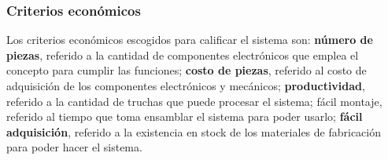 \subsubsection{Criterios económicos}

Los criterios económicos escogidos para calificar el sistema son: \textbf{número de piezas}, referido a la cantidad de componentes electrónicos que emplea el concepto para cumplir las funciones; \textbf{costo de piezas}, referido al costo de adquisición de los componentes electrónicos y mecánicos; \textbf{productividad}, referido a la cantidad de truchas que puede procesar el sistema; fácil montaje, referido al tiempo que toma ensamblar el sistema para poder usarlo; \textbf{fácil adquisición}, referido a la existencia en stock de los materiales de fabricación para poder hacer el sistema.


